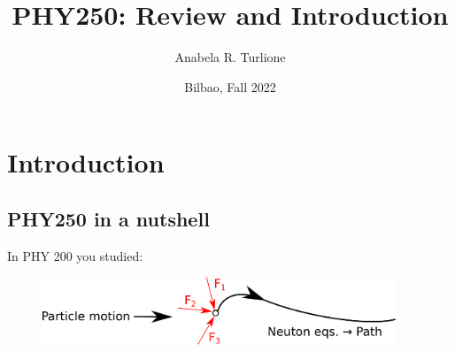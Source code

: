 \documentclass[]{beamer}
\title{PHY250: Review and Introduction}    %
\author{Anabela R. Turlione}                 %
\institute{Digipen Institute}      %
\date{Bilbao, Fall 2022}                    %
\begin{document}
\begin{frame}
  \titlepage
\end{frame}

\section[]{}

\begin{frame}
  \tableofcontents
\end{frame}

\section{Introduction}


\subsection{PHY250 in a nutshell}


\begin{frame}

  In PHY 200 you studied:

  \begin{figure}[h!]
    \begin{center}
      \includegraphics[height=0.8in]{images/rev1.png}
    \end{center}
  \end{figure}


\end{frame}
\end{document}
